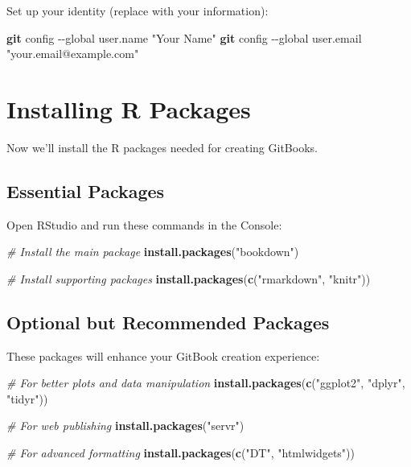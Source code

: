 \documentclass[
]{book}
\newenvironment{Shaded}{\begin{snugshade}}{\end{snugshade}}
\newcommand{\AttributeTok}[1]{\textcolor[rgb]{0.13,0.29,0.53}{#1}}
\newcommand{\CommentTok}[1]{\textcolor[rgb]{0.56,0.35,0.01}{\textit{#1}}}
\newcommand{\FunctionTok}[1]{\textcolor[rgb]{0.13,0.29,0.53}{\textbf{#1}}}
\newcommand{\NormalTok}[1]{#1}
\newcommand{\StringTok}[1]{\textcolor[rgb]{0.31,0.60,0.02}{#1}}
\begin{document}
Set up your identity (replace with your information):

\begin{Shaded}
\begin{Highlighting}[]
\FunctionTok{git}\NormalTok{ config }\AttributeTok{{-}{-}global}\NormalTok{ user.name }\StringTok{"Your Name"}
\FunctionTok{git}\NormalTok{ config }\AttributeTok{{-}{-}global}\NormalTok{ user.email }\StringTok{"your.email@example.com"}
\end{Highlighting}
\end{Shaded}

\section{Installing R Packages}\label{installing-r-packages}

Now we'll install the R packages needed for creating GitBooks.

\subsection{Essential Packages}\label{essential-packages}

Open RStudio and run these commands in the Console:

\begin{Shaded}
\begin{Highlighting}[]
\CommentTok{\# Install the main package}
\FunctionTok{install.packages}\NormalTok{(}\StringTok{"bookdown"}\NormalTok{)}

\CommentTok{\# Install supporting packages}
\FunctionTok{install.packages}\NormalTok{(}\FunctionTok{c}\NormalTok{(}\StringTok{"rmarkdown"}\NormalTok{, }\StringTok{"knitr"}\NormalTok{))}
\end{Highlighting}
\end{Shaded}

\subsection{Optional but Recommended Packages}\label{optional-but-recommended-packages}

These packages will enhance your GitBook creation experience:

\begin{Shaded}
\begin{Highlighting}[]
\CommentTok{\# For better plots and data manipulation}
\FunctionTok{install.packages}\NormalTok{(}\FunctionTok{c}\NormalTok{(}\StringTok{"ggplot2"}\NormalTok{, }\StringTok{"dplyr"}\NormalTok{, }\StringTok{"tidyr"}\NormalTok{))}

\CommentTok{\# For web publishing}
\FunctionTok{install.packages}\NormalTok{(}\StringTok{"servr"}\NormalTok{)}

\CommentTok{\# For advanced formatting}
\FunctionTok{install.packages}\NormalTok{(}\FunctionTok{c}\NormalTok{(}\StringTok{"DT"}\NormalTok{, }\StringTok{"htmlwidgets"}\NormalTok{))}
\end{Highlighting}
\end{Shaded}
\end{document}
